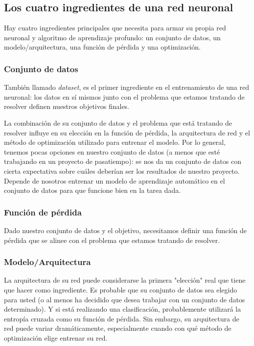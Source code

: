 \documentclass[a4paper,12pt]{article}
\begin{document}
\subsection{Los cuatro ingredientes de una red neuronal}
Hay cuatro ingredientes principales \citep{rosebrock2017deep} que necesita para armar su propia red neuronal y algoritmo de aprendizaje profundo: un conjunto de datos, un modelo/arquitectura, una función de pérdida y una optimización.
\subsubsection{Conjunto de datos}
También llamado \textit{dataset}, es el primer ingrediente en el entrenamiento de una red neuronal: los datos en sí mismos junto con el problema que estamos tratando de resolver definen nuestros objetivos finales.

La combinación de su conjunto de datos y el problema que está tratando de resolver influye en su elección en la función de pérdida, la arquitectura de red y el método de optimización utilizado para entrenar el modelo. Por lo general, tenemos pocas opciones en nuestro conjunto de datos (a menos que esté trabajando en un proyecto de pasatiempo): se nos da un conjunto de datos con cierta expectativa sobre cuáles deberían ser los resultados de nuestro proyecto. Depende de nosotros entrenar un modelo de aprendizaje automático en el conjunto de datos para que funcione bien en la tarea dada.

\subsubsection{Función de pérdida}
Dado nuestro conjunto de datos y el objetivo, necesitamos definir una función de pérdida que se alinee con el problema que estamos tratando de resolver.

\subsubsection{Modelo/Arquitectura}
La arquitectura de su red puede considerarse la primera "elección" real que tiene que hacer como ingrediente. Es probable que su conjunto de datos sea elegido para usted (o al menos ha decidido que desea trabajar con un conjunto de datos determinado). Y si está realizando una clasificación, probablemente utilizará la entropía cruzada como su función de pérdida.
Sin embargo, su arquitectura de red puede variar dramáticamente, especialmente cuando con qué método de optimización elige entrenar su red.
\end{document}
